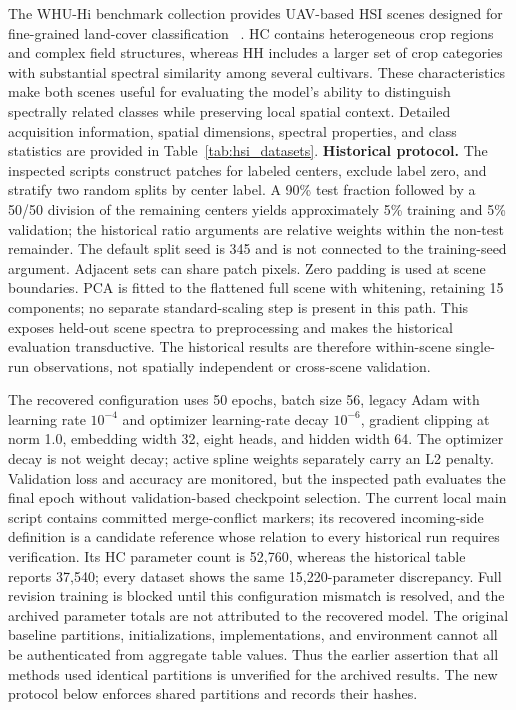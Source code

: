 \documentclass{revision_assets/ieeeaccess_revision}
\newif\ifrevisionhighlights
\newenvironment{revision}{\ifrevisionhighlights\begin{shaded*}\fi}{\ifrevisionhighlights\end{shaded*}\fi}
\begin{document}
The WHU-Hi benchmark collection provides UAV-based HSI scenes designed for fine-grained land-cover classification ~\cite{ref31}. HC contains heterogeneous crop regions and complex field structures, whereas HH includes a larger set of crop categories with substantial spectral similarity among several cultivars. These characteristics make both scenes useful for evaluating the model's ability to distinguish spectrally related classes while preserving local spatial context. Detailed acquisition information, spatial dimensions, spectral properties, and class statistics are provided in Table~\ref{tab:hsi_datasets}. \begin{revision}
\textbf{Historical protocol.} The inspected scripts construct patches for labeled centers, exclude label zero, and stratify two random splits by center label. A 90\% test fraction followed by a 50/50 division of the remaining centers yields approximately 5\% training and 5\% validation; the historical ratio arguments are relative weights within the non-test remainder. The default split seed is 345 and is not connected to the training-seed argument. Adjacent sets can share patch pixels. Zero padding is used at scene boundaries. PCA is fitted to the flattened full scene with whitening, retaining 15 components; no separate standard-scaling step is present in this path. This exposes held-out scene spectra to preprocessing and makes the historical evaluation transductive. The historical results are therefore within-scene single-run observations, not spatially independent or cross-scene validation.

The recovered configuration uses 50 epochs, batch size 56, legacy Adam with learning rate $10^{-4}$ and optimizer learning-rate decay $10^{-6}$, gradient clipping at norm 1.0, embedding width 32, eight heads, and hidden width 64. The optimizer decay is not weight decay; active spline weights separately carry an L2 penalty. Validation loss and accuracy are monitored, but the inspected path evaluates the final epoch without validation-based checkpoint selection. The current local main script contains committed merge-conflict markers; its recovered incoming-side definition is a candidate reference whose relation to every historical run requires verification. Its HC parameter count is 52,760, whereas the historical table reports 37,540; every dataset shows the same 15,220-parameter discrepancy. Full revision training is blocked until this configuration mismatch is resolved, and the archived parameter totals are not attributed to the recovered model. The original baseline partitions, initializations, implementations, and environment cannot all be authenticated from aggregate table values. Thus the earlier assertion that all methods used identical partitions is unverified for the archived results. The new protocol below enforces shared partitions and records their hashes.
\end{revision}
\end{document}
